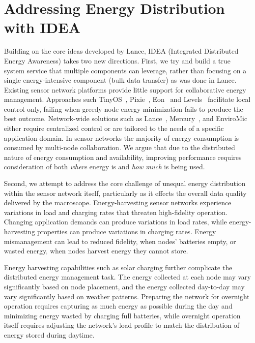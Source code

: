 \chapter{Addressing Energy Distribution with IDEA}
\label{chapter-idea}

Building on the core ideas developed by Lance, IDEA (Integrated Distributed
Energy Awareness) takes two new directions. First, we try and build a true
system service that multiple components can leverage, rather than focusing on
a single energy-intensive component (bulk data transfer) as was done in
Lance. Existing sensor network platforms provide little support for
collaborative energy management. Approaches such
TinyOS~\cite{tinyos-asplos00}, Pixie~\cite{pixie-sensys08},
Eon~\cite{eon-sensys07} and Levels~\cite{levels-sensys07} facilitate local
control only, failing when greedy node energy minimization fails to produce
the best outcome. Network-wide solutions such as
Lance~\cite{lance-sensys08}, Mercury~\cite{parkinsons-embs07}, and
EnviroMic~\cite{enviromic} either require centralized control or are tailored
to the needs of a specific application domain. In sensor networks the
majority of energy consumption is consumed by multi-node collaboration. We
argue that due to the distributed nature of energy consumption and
availability, improving performance requires consideration of both
\textit{where} energy is and \textit{how much} is being used.

Second, we attempt to address the core challenge of unequal energy
distribution within the sensor network itself, particularly as it effects the
overall data quality delivered by the macroscope. Energy-harvesting sensor
networks experience variations in load and charging rates that threaten
high-fidelity operation. Changing application demands can produce variations
in load rates, while energy-harvesting properties can produce variations in
charging rates. Energy mismanagement can lead to reduced fidelity, when
nodes' batteries empty, or wasted energy, when nodes harvest energy they
cannot store.

Energy harvesting capabilities such as solar charging further complicate the
distributed energy management task. The energy collected at each node may
vary significantly based on node placement, and the energy collected
day-to-day may vary significantly based on weather patterns. Preparing the
network for overnight operation requires capturing as much energy as possible
during the day and minimizing energy wasted by charging full batteries, while
overnight operation itself requires adjusting the network's load profile to
match the distribution of energy stored during daytime.

